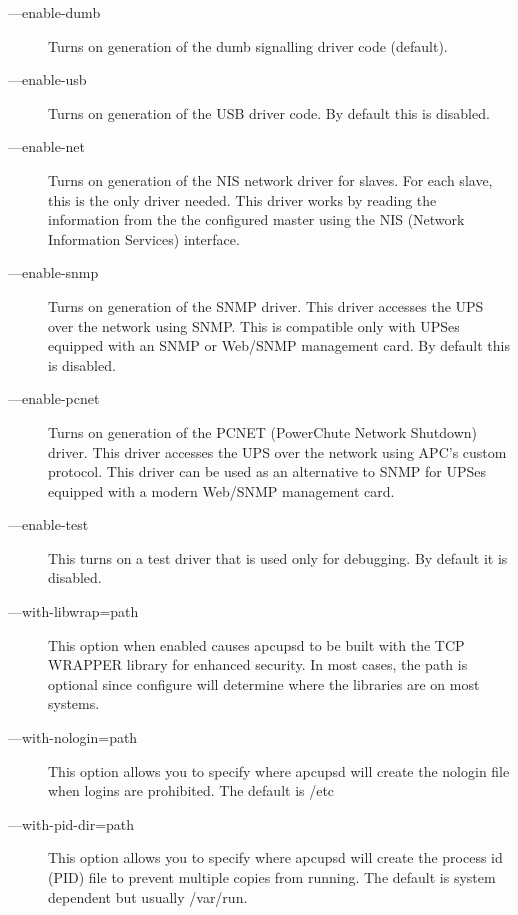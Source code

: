 \begin{description}
\item [{---}enable-dumb]
   Turns on generation of the dumb signalling driver code (default).  

\item [{---}enable-usb]
   Turns on generation of the USB driver code. By default this is disabled.  

\item [{---}enable-net]
   Turns on generation of the NIS network driver for slaves. For each slave,
this is the only driver needed. This driver works by reading the information
from the the configured master using the NIS (Network Information Services)
interface.  

\item [{---}enable-snmp]
   Turns on generation of the SNMP driver. This driver accesses the UPS over
the network using SNMP. This is compatible only with UPSes equipped with an
SNMP or Web/SNMP management card. By default this is disabled.  

\item [{---}enable-pcnet]
   Turns on generation of the PCNET (PowerChute Network Shutdown) driver.
This driver accesses the UPS over the network using APC's custom protocol.
This driver can be used as an alternative to SNMP for UPSes equipped with
a modern Web/SNMP management card.

\item [{---}enable-test]
   This turns on a test driver that is used only for debugging. By default it is
disabled.  

\item [{---}with-libwrap=\lt{}path\gt{}]
   This option when enabled causes apcupsd to be built with the TCP WRAPPER
library for enhanced security. In most cases, the \lt{}path\gt{} is optional
since configure will determine where the libraries are on most systems.  

\item [{---}with-nologin=\lt{}path\gt{}]
   This option allows you to specify where apcupsd will create the nologin file
when logins are prohibited. The default is /etc  

\item [{---}with-pid-dir=\lt{}path\gt{}]
   This option allows you to specify where apcupsd will create the process id
(PID) file to prevent multiple copies from running. The default is system
dependent but usually /var/run.  


\end{description}
